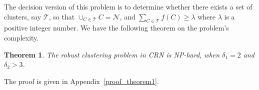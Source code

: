 \documentclass[times]{ettauth}
\theoremstyle{mytheoremstyle}
\newtheorem{theorem}{Theorem}[section]
\theoremstyle{mytheoremstyle}
\theoremstyle{mytheoremstyle}
\begin{document}
The decision version of this problem is to determine whether there exists a set of clusters, say $\mathcal{T}$, so that $\cup_{C\in\mathcal{T}} C = \mathcal{N}$, and $\sum_{C\in \mathcal{T}} f(C) \geqslant \lambda$ where $\lambda$ is a positive integer number.
We have the following theorem on the problem's complexity.
\begin{theorem}
\label{theorem1}
The robust clustering problem in CRN is NP-hard, when $\delta_1=2$ and $\delta_2 > 3$.
\end{theorem}
The proof is given in Appendix~\ref{proof_theorem1}.
\end{document}
